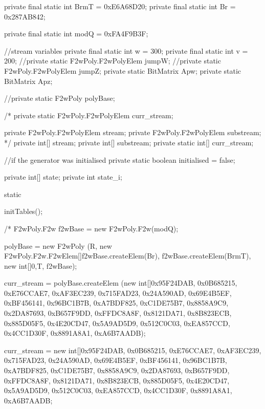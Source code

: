 \begin{code}
\begin{hide}
{   private final static int BrmT = 0xE6A68D20;
   private final static int Br = 0x287AB842;

   private final static int modQ = 0xFA4F9B3F;

   //stream variables
   private final static int w = 300;
   private final static int v = 200;
   //private static F2wPoly.F2wPolyElem jumpW;
   //private static F2wPoly.F2wPolyElem jumpZ;
   private static BitMatrix Apw;
   private static BitMatrix Apz;

   //private static F2wPoly polyBase;

   /*
   private static F2wPoly.F2wPolyElem curr_stream;

   private F2wPoly.F2wPolyElem stream;
   private F2wPoly.F2wPolyElem substream;
   */
   private int[] stream;
   private int[] substream;
   private static int[] curr_stream;

   //if the generator was initialised
   private static boolean initialised = false;

   private int[] state;
   private int state_i;


   static
   {
      initTables();

      /*
      F2wPoly.F2w f2wBase = new F2wPoly.F2w(modQ);

      polyBase = new F2wPoly
                 (R, new F2wPoly.F2w.F2wElem[]{f2wBase.createElem(Br),
                                               f2wBase.createElem(BrmT)},
                  new int[]{0,T}, f2wBase);


      curr_stream = polyBase.createElem
                    (new int[]{0x95F24DAB, 0x0B685215, 0xE76CCAE7, 0xAF3EC239,
                               0x715FAD23, 0x24A590AD, 0x69E4B5EF, 0xBF456141,
                               0x96BC1B7B, 0xA7BDF825, 0xC1DE75B7, 0x8858A9C9,
                               0x2DA87693, 0xB657F9DD, 0xFFDC8A8F, 0x8121DA71,
                               0x8B823ECB, 0x885D05F5, 0x4E20CD47, 0x5A9AD5D9,
                               0x512C0C03, 0xEA857CCD, 0x4CC1D30F, 0x8891A8A1,
                               0xA6B7AADB});

      curr_stream = new int[]{0x95F24DAB, 0x0B685215, 0xE76CCAE7, 0xAF3EC239,
                              0x715FAD23, 0x24A590AD, 0x69E4B5EF, 0xBF456141,
                              0x96BC1B7B, 0xA7BDF825, 0xC1DE75B7, 0x8858A9C9,
                              0x2DA87693, 0xB657F9DD, 0xFFDC8A8F, 0x8121DA71,
                              0x8B823ECB, 0x885D05F5, 0x4E20CD47, 0x5A9AD5D9,
                              0x512C0C03, 0xEA857CCD, 0x4CC1D30F, 0x8891A8A1,
                              0xA6B7AADB};

}}
\end{hide}
\end{code}
